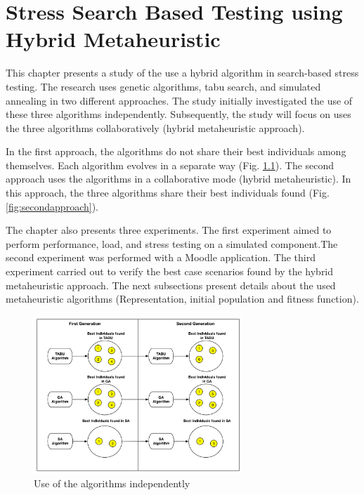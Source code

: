 \documentclass[espaco=umemeio,chapter=TITLE,twoside,openright]{abnt}
\begin{document}
\chapter{Stress Search Based Testing using Hybrid Metaheuristic}

This chapter presents a study of the use a hybrid algorithm in search-based stress testing. The research uses genetic algorithms, tabu search, and simulated annealing in two different approaches. The study initially investigated the use of these three algorithms independently. Subsequently, the study will focus on uses the three algorithms collaboratively (hybrid metaheuristic approach).

In the first approach, the algorithms do not share their best individuals among themselves. Each algorithm evolves in a separate way (Fig. \ref{fig:firstaproach}). The second approach uses the algorithms in a collaborative mode (hybrid metaheuristic). In this approach, the three algorithms share their best individuals found (Fig. \ref{fig:secondapproach}). 


The chapter also presents three experiments. The first experiment aimed to perform performance, load, and stress testing on a simulated component.The second experiment was performed with a Moodle application. The third experiment carried out to verify the best case scenarios found by the hybrid metaheuristic approach.  The next subsections present details about the used metaheuristic algorithms (Representation, initial population and fitness function).

\begin{figure}[h]
\centering
\includegraphics[width=0.7\textwidth]{./images/independ.png}
\caption{Use of the algorithms independently \cite{Gois2016}}
\label{fig:firstaproach}
\end{figure}
\end{document}
